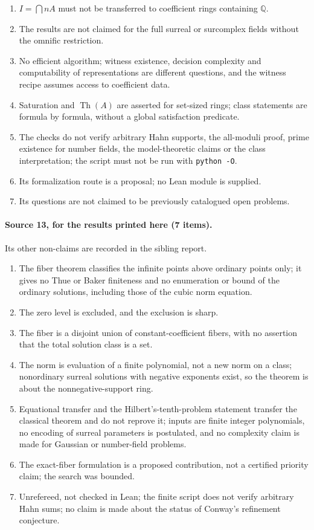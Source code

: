 \documentclass[11pt,oneside]{article}
\numberwithin{equation}{section}
\theoremstyle{definition}
\theoremstyle{remark}
\newcommand{\Q}{\mathbb Q}
\newcommand{\Th}{\operatorname{Th}}
\begin{document}
\begin{enumerate}[leftmargin=*,itemsep=1pt]
say that every variety has only constant points; coefficients outside $A$ are
read in the ambient ring.
\item $I=\bigcap nA$ must not be transferred to coefficient rings containing
$\Q$.
\item The results are not claimed for the full surreal or surcomplex fields
without the omnific restriction.
\item No efficient algorithm; witness existence, decision complexity and
computability of representations are different questions, and the witness
recipe assumes access to coefficient data.
\item Saturation and $\Th(A)$ are asserted for set-sized rings; class
statements are formula by formula, without a global satisfaction predicate.
\item The checks do not verify arbitrary Hahn supports, the all-moduli proof,
prime existence for number fields, the model-theoretic claims or the class
interpretation; the script must not be run with \texttt{python -O}.
\item Its formalization route is a proposal; no Lean module is supplied.
\item Its questions are not claimed to be previously catalogued open problems.
\end{enumerate}

\paragraph{Source 13, for the results printed here (7 items).} Its other
non-claims are recorded in the sibling report.
\begin{enumerate}[leftmargin=*,itemsep=1pt]
\item The fiber theorem classifies the infinite points above ordinary points
only; it gives no Thue or Baker finiteness and no enumeration or bound of the
ordinary solutions, including those of the cubic norm equation.
\item The zero level is excluded, and the exclusion is sharp.
\item The fiber is a disjoint union of constant-coefficient fibers, with no
assertion that the total solution class is a set.
\item The norm is evaluation of a finite polynomial, not a new norm on a class;
nonordinary surreal solutions with negative exponents exist, so the theorem is
about the nonnegative-support ring.
\item Equational transfer and the Hilbert's-tenth-problem statement transfer
the classical theorem and do not reprove it; inputs are finite integer
polynomials, no encoding of surreal parameters is postulated, and no
complexity claim is made for Gaussian or number-field problems.
\item The exact-fiber formulation is a proposed contribution, not a certified
priority claim; the search was bounded.
\item Unrefereed, not checked in Lean; the finite script does not verify
arbitrary Hahn sums; no claim is made about the status of Conway's refinement
conjecture.
\end{enumerate}
\end{document}
